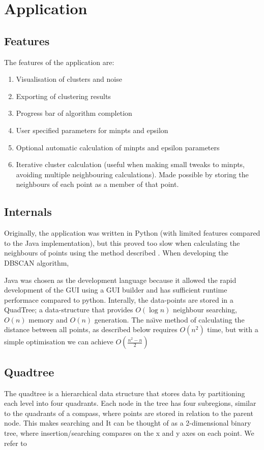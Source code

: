 \documentclass{CRPITStyle}
\begin{document}
\section{Application}
\subsection{Features}
The features of the application are:
\begin{enumerate}
\item Visualisation of clusters and noise
\item Exporting of clustering results
\item Progress bar of algorithm completion
\item User specified parameters for minpts and epsilon
\item Optional automatic calculation of minpts and epsilon parameters 
\item Iterative cluster calculation (useful when making small tweaks to minpts, avoiding multiple neighbouring calculations). Made possible by storing the neighbours of each point as a member of that point.
\end{enumerate}

\subsection{Internals}
Originally, the application was written in Python (with limited features compared to the Java implementation), but this proved too slow when calculating the neighbours of points using the method described . When developing the DBSCAN algorithm, 

Java was chosen as the development language because it allowed the rapid development of the GUI using a GUI builder and has sufficient runtime performace compared to python. Interally, the data-points are stored in a QuadTree; a data-structure that provides $O(\log n)$ neighbour searching, $O(n)$ memory and $O(n)$ generation. The na\"{\i}ve method of calculating the distance between all points, as described below requires $O(n^2)$ time, but with a simple optimisation we can achieve $O(\frac{n^2 -n}{2})$

\subsection{Quadtree}
The quadtree \citet{Samet:1984:QRH:356924.356930} is a hierarchical data structure that stores data by partitioning each level into four quadrants. Each node in the tree has four subregions, similar to the quadrants of a compass, where points are stored in relation to the parent node. This makes searching and  It can be thought of as a 2-dimensional binary tree, where insertion/searching compares on the x and y axes on each point. We refer to
\end{document}
